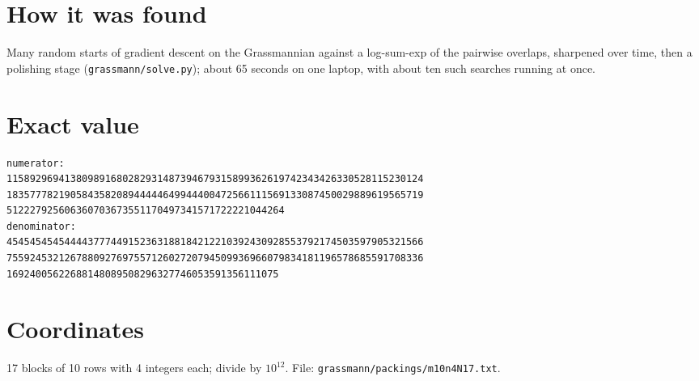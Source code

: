 \documentclass[11pt,a4paper]{article}
\begin{document}
\section{How it was found}
Many random starts of gradient descent on the Grassmannian against a log-sum-exp of the pairwise overlaps, sharpened over time, then a polishing stage (\texttt{grassmann/solve.py}); about 65 seconds on one laptop, with about ten such searches running at once.


\appendix
\section{Exact value}
{\small
\begin{verbatim}
numerator:
115892969413809891680282931487394679315899362619742343426330528115230124
183577782190584358208944444649944400472566111569133087450029889619565719
512227925606360703673551170497341571722221044264
denominator:
454545454544443777449152363188184212210392430928553792174503597905321566
755924532126788092769755712602720794509936966079834181196578685591708336
16924005622688148089508296327746053591356111075
\end{verbatim}}

\section{Coordinates}
17 blocks of 10 rows with 4 integers each; divide by $10^{12}$. File: \texttt{grassmann/packings/m10n4N17.txt}.
{\tiny
\begin{multicols}{3}
\end{multicols}}
\end{document}
